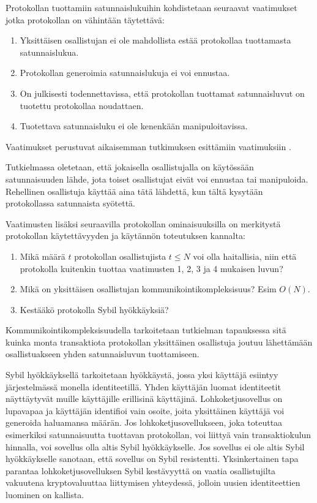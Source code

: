 Protokollan tuottamiin satunnaislukuihin kohdistetaan seuraavat vaatimukset jotka protokollan on vähintään täytettävä:
\begin{enumerate}
    \item Yksittäisen osallistujan ei ole mahdollista estää protokollaa tuottamasta satunnaislukua.
    \item Protokollan generoimia satunnaislukuja ei voi ennustaa.
    \item On julkisesti todennettavissa, että protokollan tuottamat satunnaisluvut on tuotettu protokollaa noudattaen.
    \item Tuotettava satunnaisluku ei ole kenenkään manipuloitavissa.
\end{enumerate}

Vaatimukset perustuvat aikaisemman tutkimuksen esittämiin vaatimuksiin \cite{cherniaeva2019homomorphic, schindler_hydrand_2020, syta_scalable_2017}. 

Tutkielmassa oletetaan, että jokaisella osallistujalla on käytössään satunnaisuuden lähde, jota toiset osallistujat eivät voi ennustaa tai manipuloida. Rehellinen osallistuja käyttää aina tätä lähdettä, kun tältä kysytään protokollassa satunnaista syötettä.

Vaatimusten lisäksi seuraavilla protokollan ominaisuuksilla on merkitystä protokollan käytettävyyden ja käytännön toteutuksen kannalta:

\begin{enumerate}
    \item Mikä määrä $t$ protokollan osallistujista $t \leq N$ voi olla haitallisia, niin että protokolla kuitenkin tuottaa vaatimusten 1, 2, 3 ja 4 mukaisen luvun?
    \item Mikä on yksittäisen osallistujan kommunikointikompleksisuus? Esim $O(N)$.
    \item Kestääkö protokolla Sybil hyökkäyksiä?
\end{enumerate}

Kommunikointikompleksisuudella tarkoitetaan tutkielman tapauksessa sitä kuinka monta transaktiota protokollan yksittäinen osallistuja joutuu lähettämään osallistuakseen yhden satunnaisluvun tuottamiseen. 

Sybil hyökkäyksellä \cite{douceur2002sybil} tarkoitetaan hyökkäystä, jossa yksi käyttäjä esiintyy järjestelmässä monella identiteetillä. Yhden käyttäjän luomat identiteetit näyttäytyvät muille käyttäjille erillisinä käyttäjinä. Lohkoketjusovellus on lupavapaa ja käyttäjän identifioi vain osoite, joita yksittäinen käyttäjä voi generoida haluamansa määrän. Jos lohkoketjusovellukseen, joka toteuttaa esimerkiksi satunnaisuutta tuottavan protokollan, voi liittyä vain transaktiokulun hinnalla, voi sovellus olla altis Sybil hyökkäykselle. Jos sovellus ei ole altis Sybil hyökkäykselle sanotaan, että sovellus on Sybil resistentti. Yksinkertainen tapa parantaa lohkoketjusovelluksen Sybil kestävyyttä on vaatia osallistujilta vakuutena kryptovaluuttaa liittymisen yhteydessä, jolloin uusien identiteettien luominen on kallista.